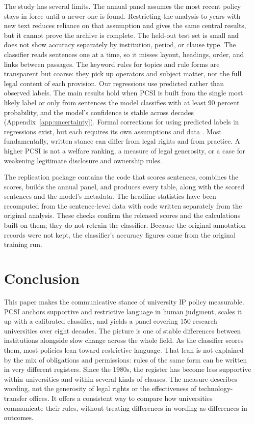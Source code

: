 \documentclass[11pt]{article}
\begin{document}
The study has several limits. The annual panel assumes the most recent policy stays in force until a newer one is found. Restricting the analysis to years with new text reduces reliance on that assumption and gives the same central results, but it cannot prove the archive is complete. The held-out test set is small and does not show accuracy separately by institution, period, or clause type. The classifier reads sentences one at a time, so it misses layout, headings, order, and links between passages. The keyword rules for topics and rule forms are transparent but coarse: they pick up operators and subject matter, not the full legal content of each provision. Our regressions use predicted rather than observed labels. The main results hold when PCSI is built from the single most likely label or only from sentences the model classifies with at least 90 percent probability, and the model's confidence is stable across decades (Appendix~\ref{app:uncertainty}). Formal corrections for using predicted labels in regressions exist, but each requires its own assumptions and data \citep{egami2023using,battaglia2024inference}. Most fundamentally, written stance can differ from legal rights and from practice. A higher PCSI is not a welfare ranking, a measure of legal generosity, or a case for weakening legitimate disclosure and ownership rules.

The replication package contains the code that scores sentences, combines the scores, builds the annual panel, and produces every table, along with the scored sentences and the model's metadata. The headline statistics have been recomputed from the sentence-level data with code written separately from the original analysis. These checks confirm the released scores and the calculations built on them; they do not retrain the classifier. Because the original annotation records were not kept, the classifier's accuracy figures come from the original training run.

\section{Conclusion}\label{sec:conclusion}

This paper makes the communicative stance of university IP policy measurable. PCSI anchors supportive and restrictive language in human judgment, scales it up with a calibrated classifier, and yields a panel covering 150 research universities over eight decades. The picture is one of stable differences between institutions alongside slow change across the whole field. As the classifier scores them, most policies lean toward restrictive language. That lean is not explained by the mix of obligations and permissions: rules of the same form can be written in very different registers. Since the 1980s, the register has become less supportive within universities and within several kinds of clauses. The measure describes wording, not the generosity of legal rights or the effectiveness of technology-transfer offices. It offers a consistent way to compare how universities communicate their rules, without treating differences in wording as differences in outcomes.
\end{document}
